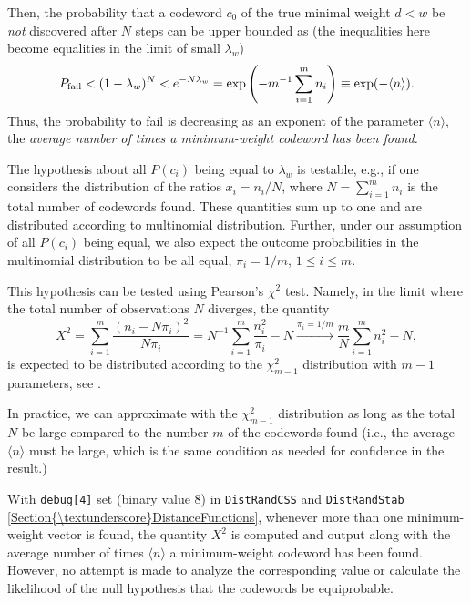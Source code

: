 \documentclass[a4paper,11pt]{report}
\begin{document}
{{ Then, the probability that a codeword $c_0$ of the true minimal weight $ d < w $ be \emph{not} discovered after $N$ steps can be upper bounded as (the inequalities here become equalities in the
limit of small $\lambda_w$) 
\[ P_{\rm fail} < (1-\lambda_w)^N < e^{-N\lambda_w}=\exp\left(-m^{-1}\sum_{i=1}^m
n_i\right)\equiv \exp(-\langle n\rangle). \]
 Thus, the probability to fail is decreasing as an exponent of the parameter $\langle n\rangle$, the \emph{average number of times a minimum-weight codeword has been found.} 

 The hypothesis about all $P(c_i)$ being equal to $\lambda_w$ is testable, e.g., if one considers the distribution of the ratios $x_i=n_i/N$, where $N=\sum_{i=1}^m n_i$ is the total number of codewords found. These quantities sum up to one and are
distributed according to multinomial distribution\cite{Steel-1953}. Further, under our assumption of all $P(c_i)$ being equal, we also expect the outcome probabilities in the multinomial
distribution to be all equal, $\pi_i=1/m$, $1\le i\le m$. 

 This hypothesis can be tested using Pearson's $\chi^2$ test. Namely, in the limit where the total number of observations $N$ diverges, the quantity 
\[ X^2=\sum_{i=1}^m \frac{(n_i-N \pi_i)^2}{ N\pi_i}= N^{-1}\sum_{i=1}^m
\frac{n_i^2}{\pi_i}-N \stackrel{\pi_i=1/m}\to\frac{m}{N}\sum_{i=1}^m n_i^2-N, \]
 is expected to be distributed according to the $\chi^2_{m-1}$ distribution with $m-1$ parameters, see \cite{Chernoff-Lehmann-1954} \cite{Cramer-book-1999}. 

 In practice, we can approximate with the $\chi^2_{m-1}$ distribution as long as the total $N$ be large compared to the number $m$ of the codewords found (i.e., the average $\langle n\rangle$ must be large, which is the same condition as needed for confidence in the
result.) 

 With \texttt{debug[4]} set (binary value 8) in \texttt{DistRandCSS} and \texttt{DistRandStab} \ref{Section{\textunderscore}DistanceFunctions}, whenever more than one minimum-weight vector is found, the quantity $X^2$ is computed and output along with the average number of times $\langle n\rangle$ a minimum-weight codeword has been found. However, no attempt is made to
analyze the corresponding value or calculate the likelihood of the null
hypothesis that the codewords be equiprobable. 

 }

 }

   
\end{document}
